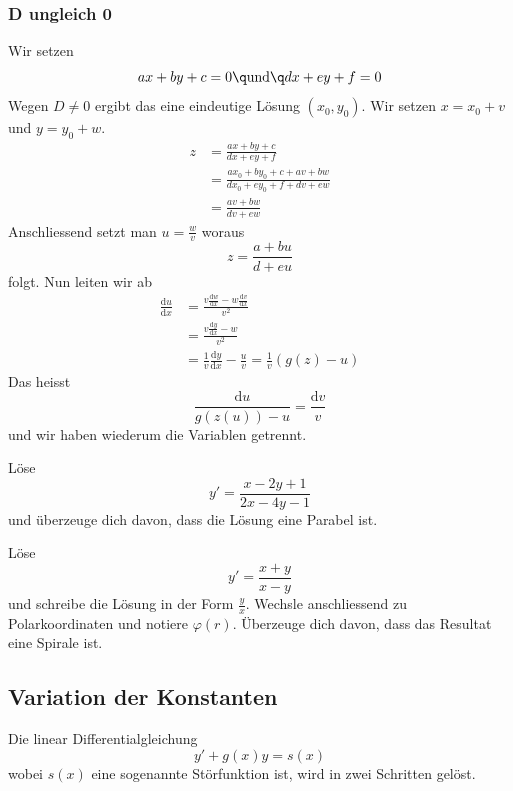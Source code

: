 \documentclass[%
11pt,%
twoside,%
titlepage,%
german,%
headsepline%
]{scrartcl}
\begin{document}
 \subsubsection{D ungleich 0}
 
 Wir setzen
 $$ax+by+c=0\q\text{und}\q dx+ey+f=0$$
 Wegen $D\neq0$ ergibt das eine eindeutige L\"osung $(x_0,y_0)$. Wir setzen $x=x_0+v$ und $y=y_0+w$.
 \begin{align*}
z &= \frac{ax+by+c}{dx+ey+f}\\
&=\frac{ax_0+by_0+c+av+bw}{dx_0+ey_0+f+dv+ew}\\
&=\frac{av+bw}{dv+ew}
\end{align*}
Anschliessend setzt man $u=\frac{w}{v}$ woraus
$$z=\frac{a+bu}{d+eu}$$
folgt. Nun leiten wir ab
\begin{align*}
\frac{\mathrm{d}u}{\mathrm{d}x}&=\frac{v\frac{\mathrm{d}w}{\mathrm{d}x}-w\frac{\mathrm{d}v}{\mathrm{d}x}}{v^2}\\
&=\frac{v\frac{\mathrm{d}y}{\mathrm{d}x}-w}{v^2}\\
&=\frac{1}{v}\frac{\mathrm{d}y}{\mathrm{d}x}-\frac{u}{v}=\frac{1}{v}(g(z)-u)
\end{align*}
Das heisst
$$\frac{\mathrm{d}u}{g(z(u))-u}=\frac{\mathrm{d}v}{v}$$
und wir haben wiederum die Variablen getrennt.

\begin{ueb}
L\"ose
$$y'=\frac{x-2y+1}{2x-4y-1}$$
und \"uberzeuge dich davon, dass die L\"osung eine Parabel ist.
\end{ueb}

\begin{ueb}
L\"ose
$$y'=\frac{x+y}{x-y}$$
und schreibe die L\"osung in der Form $\frac{y}{x}$. Wechsle anschliessend zu Polarkoordinaten und notiere $\varphi(r)$. \"Uberzeuge dich davon, dass das Resultat eine Spirale ist.
\end{ueb}

\subsection{Variation der Konstanten}

Die linear Differentialgleichung
$$y'+g(x)y=s(x)$$
wobei $s(x)$ eine sogenannte St\"orfunktion ist, wird in zwei Schritten gel\"ost.
\end{document}
